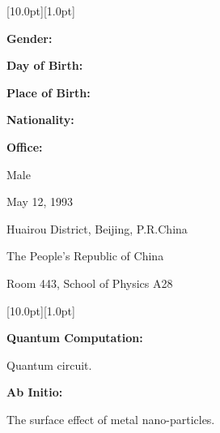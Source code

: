 \documentclass[12pt,a4paper,utf8]{report}
\begin{document}
\begin{minipage}[t]{16cm}
    \colorbox{subtitlecolor}{\raisebox{0pt}[10.0pt][1.0pt]{
        \textcolor{white}{\textsf{}}}}
\end{minipage}\par
\vspace{0.2cm}
    \begin{minipage}[t]{4cm}
        \qquad \textbf{Gender:}\par
        \qquad \textbf{Day of Birth:}\par
        \qquad \textbf{Place of Birth:}\par
        \qquad \textbf{Nationality:}\par
        \qquad \textbf{Office:}\par
    \end{minipage}
    \begin{minipage}[t]{12cm}
        Male \par
        May 12, 1993 \par
        Huairou District, Beijing, P.R.China \par
        The People's Republic of China \par
        Room 443, School of Physics A28 \par
    \end{minipage}\par
\vspace{0.4cm}

\begin{minipage}[t]{16cm}
    \colorbox{subtitlecolor}{\raisebox{0pt}[10.0pt][1.0pt]{
        \textcolor{white}{\textsf{}}}}
\end{minipage}\par
\vspace{0.2cm}\hspace{0.5cm}
    \begin{minipage}[t]{15.0cm}
        {\textbf{Quantum Computation:}}\par
        \quad Quantum circuit. \par
    \vspace{0.2cm}
        {\textbf{Ab Initio:}}\par
        \quad The surface effect of metal nano-particles.
    \end{minipage}\par
\vspace{0.4cm}
\end{document}
